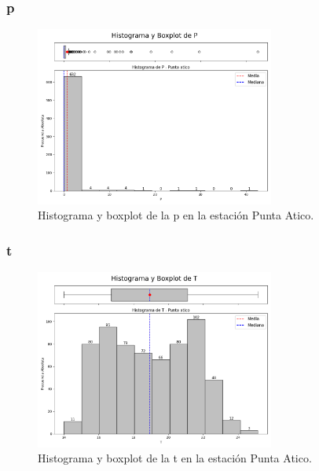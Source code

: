 \subsubsection*{\gls{p} }
\begin{figure}[htbp]
\centering
\includegraphics[width=0.7\textwidth]{resultados/por_estacion_meteorologica/Punta_Atico/P_histograma.png}
\caption{Histograma y boxplot de la \gls{p}  en la estación Punta Atico.}
\label{fig:punta_atico_P}
\end{figure}

\subsubsection*{\gls{t} }
\begin{figure}[htbp]
\centering
\includegraphics[width=0.7\textwidth]{resultados/por_estacion_meteorologica/Punta_Atico/T_histograma.png}
\caption{Histograma y boxplot de la \gls{t}  en la estación Punta Atico.}
\label{fig:punta_atico_T}
\end{figure}

